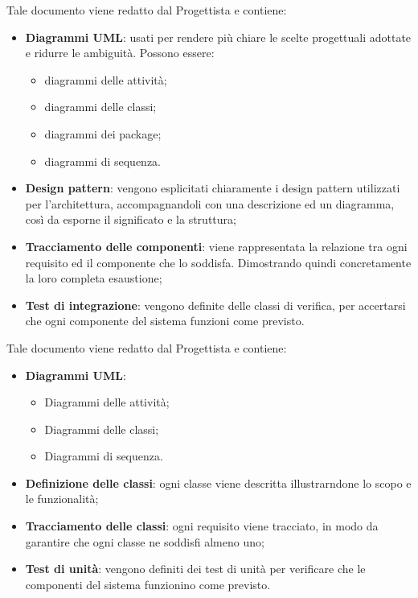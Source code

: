 	     Tale documento viene redatto dal Progettista e contiene:
	     \begin{itemize}
	     	\item{\textbf{Diagrammi UML}: usati per rendere più chiare le scelte progettuali adottate e ridurre le ambiguità. Possono essere:
                    \begin{itemize}
                    	\item{diagrammi delle attività;}
    			\item{diagrammi delle classi;}
    			\item{diagrammi dei package;}    			
			\item{diagrammi di sequenza.}                    
		\end{itemize}
}
		\item{\textbf{Design pattern}: vengono esplicitati chiaramente i design pattern utilizzati per l'architettura, accompagnandoli con una descrizione ed un diagramma, così da esporne il significato e la struttura;}
		\item{\textbf{Tracciamento delle componenti}: viene rappresentata la relazione tra ogni requisito ed il componente che lo soddisfa. Dimostrando quindi concretamente la loro completa esaustione;}
		\item{\textbf{Test di integrazione}: vengono definite delle classi di verifica, per accertarsi che ogni componente del sistema funzioni come previsto.}
	     \end{itemize}
	     
	     Tale documento viene redatto dal Progettista e contiene:
	     \begin{itemize}
	     	\item{\textbf{Diagrammi UML}:
			\begin{itemize}
				\item{Diagrammi delle attività;}
    				\item{Diagrammi delle classi;}
				\item{Diagrammi di sequenza.}
			\end{itemize}
			}
		\item{\textbf{Definizione delle classi}: ogni classe viene descritta illustrarndone lo scopo e le funzionalità;}
		\item{\textbf{Tracciamento delle classi}: ogni requisito viene tracciato, in modo da garantire che ogni classe ne soddisfi almeno uno;}
		\item{\textbf{Test di unità}: vengono definiti dei test di unità per verificare che le componenti del sistema funzionino come previsto.}
	     \end{itemize}
	     
